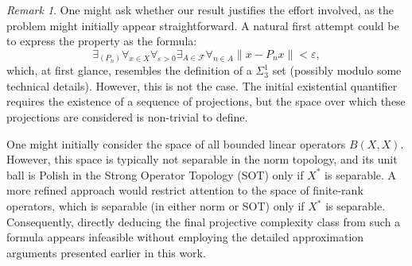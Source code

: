 \documentclass[12pt,fleqn]{amsart}
\newcommand{\jarekin}[1]{\todo[inline, linecolor=Green, backgroundcolor=Green!25, bordercolor=Green, caption={Jarek}]{%
    \begin{minipage}{\textwidth-30pt}#1\end{minipage}}}
\renewcommand{\leq}{\leqslant}
\theoremstyle{definition}
\theoremstyle{remark}
\newtheorem{remark}{Remark}
\begin{document}

\begin{remark}
    One might ask whether our result justifies the effort involved, as the problem might initially appear straightforward. A natural first attempt could be to express the property as the formula:
    \[
        \exists_{(P_n)} \forall_{x \in X} \forall_{\varepsilon > 0} \exists_{A \in \mathcal{F}} \forall_{n \in A} \|x - P_n x\| < \varepsilon,
    \]
    which, at first glance, resembles the definition of a \(\Sigma^1_3\) set (possibly modulo some technical details). However, this is not the case. The initial existential quantifier requires the existence of a sequence of projections, but the space over which these projections are considered is non-trivial to define. 

    One might initially consider the space of all bounded linear operators \(B(X, X)\). However, this space is typically not separable in the norm topology, and its unit ball is Polish in the Strong Operator Topology (SOT) only if \(X^*\) is separable. A more refined approach would restrict attention to the space of finite-rank operators, which is separable (in either norm or SOT) only if \(X^*\) is separable. Consequently, directly deducing the final projective complexity class from such a formula appears infeasible without employing the detailed approximation arguments presented earlier in this work.
\end{remark}
\end{document}
